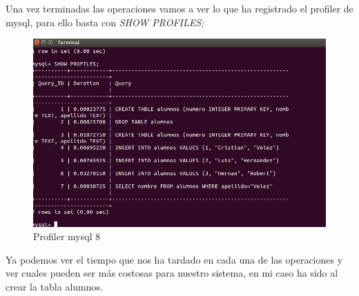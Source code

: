 Una vez terminadas las operaciones vamos a ver lo que ha registrado el profiler de mysql, para ello basta con \textit{SHOW PROFILES;}

\begin{figure}[H] %
	\centering
	\includegraphics[scale=0.35]{pics/profile8.png}  %
	\caption{Profiler mysql 8} \label{fig:p8}
\end{figure}

Ya podemos ver el tiempo que nos ha tardado en cada una de las operaciones y ver cuales pueden ser más costosas para nuestro sistema, en mi caso ha sido al crear la tabla alumnos.




\grid
